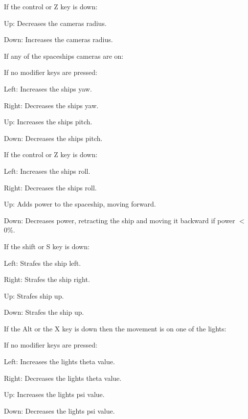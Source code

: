 If the control or Z key is down\+:


\begin{DoxyItemize}
\item Up\+: Decreases the camera\textquotesingle{}s radius.
\item Down\+: Increases the camera\textquotesingle{}s radius.
\end{DoxyItemize}

If any of the spaceship\textquotesingle{}s cameras are on\+:

If no modifier keys are pressed\+:


\begin{DoxyItemize}
\item Left\+: Increases the ship\textquotesingle{}s yaw.
\item Right\+: Decreases the ship\textquotesingle{}s yaw.
\item Up\+: Increases the ship\textquotesingle{}s pitch.
\item Down\+: Decreases the ship\textquotesingle{}s pitch.
\end{DoxyItemize}

If the control or Z key is down\+:


\begin{DoxyItemize}
\item Left\+: Increases the ship\textquotesingle{}s roll.
\item Right\+: Decreases the ship\textquotesingle{}s roll.
\item Up\+: Adds power to the spaceship, moving forward.
\item Down\+: Decreases power, retracting the ship and moving it backward if power $<$ 0\%.
\end{DoxyItemize}

If the shift or S key is down\+:


\begin{DoxyItemize}
\item Left\+: Strafes the ship left.
\item Right\+: Strafes the ship right.
\item Up\+: Strafes ship up.
\item Down\+: Strafes the ship up.
\end{DoxyItemize}

If the Alt or the X key is down then the movement is on one of the lights\+:

If no modifier keys are pressed\+:


\begin{DoxyItemize}
\item Left\+: Increases the light\textquotesingle{}s theta value.
\item Right\+: Decreases the light\textquotesingle{}s theta value.
\item Up\+: Increases the light\textquotesingle{}s psi value.
\item Down\+: Decreases the light\textquotesingle{}s psi value.
\end{DoxyItemize}

